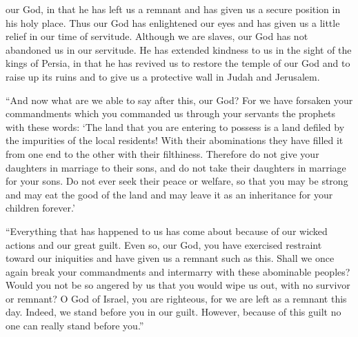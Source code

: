 {{}
our God,
in that he has left
us a remnant
and has given
us a secure position
in his holy
place.
Thus our God
has enlightened
our eyes
and has given
us a little
relief
in our time of servitude.
Although
we
are slaves,
our God
has not
abandoned
us in our servitude.
He has extended
kindness
to us
in the sight of the kings
of Persia,
in that he has revived
us to restore the
temple
of our God
and to raise up
its ruins
and to give
us a protective wall
in Judah
and Jerusalem.
\par }{\PP {}“And now
what
are we able to say
after
this,
our God? For we
have forsaken
your commandments
which
you commanded
us through
your servants
the prophets
with these words: ‘The land
that
you
are entering
to possess
is a land
defiled by the impurities
of the local
residents! With their
abominations
they have
filled
it from one end to
the other with their filthiness.
Therefore
do not
give
your daughters
in marriage to their sons,
and do not
take
their daughters
in marriage for your sons.
Do not
ever seek
their peace
or welfare,
so that
you may be strong
and may eat
the good
of the land
and may leave it as an inheritance
for
your children
forever.’
\par }{\PP {}“Everything
that has happened
to us has come
about because
of our wicked
actions
and our great
guilt.
Even so,
our God,
you
have exercised restraint
toward our iniquities
and have given
us a remnant
such as this.
Shall we once again
break
your commandments
and intermarry
with these
abominable
peoples? Would you not
be so angered
by
us that you would wipe
us out, with no
survivor
or remnant?
O
{}
God
of Israel,
you
are righteous,
for
we are left
as a remnant
this
day.
Indeed,
we stand before
you in our guilt.
However, because
of this
guilt no one
can really stand
before you.”

}
